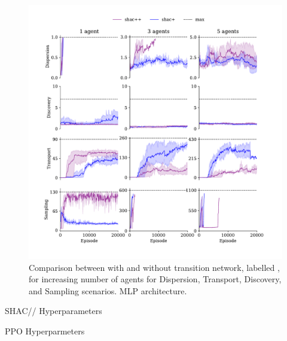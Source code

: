 \begin{figure}[t]
    \centering
    \includegraphics[width=\columnwidth]{figs/ablation-mlp.pdf}
    \caption{Comparison between \fname{} with and without transition network, labelled \fnamer{}, for increasing number of agents for Dispersion, Transport, Discovery, and Sampling scenarios. MLP architecture.}
    \label{fig:ablation-mlp}\vspace{0.5cm}
\end{figure}
\begin{table}[t]
    \begin{minipage}{0.48\textwidth}
        \centering
        
        \caption{SHAC/\fname{}/\fnamer{} Hyperparameters}
        \label{apx:tab:shac}
    \end{minipage}%
    \hfill
    \begin{minipage}{0.48\textwidth}
        \centering
        
        \caption{PPO Hyperparmeters}
        \label{apx:tab:ppo}
    \end{minipage}
    \vspace{0.5cm}
\end{table}
